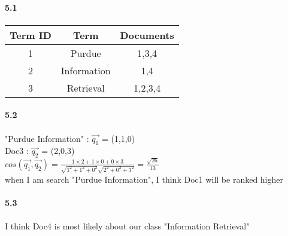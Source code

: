 \documentclass{article}
\begin{document}
	\paragraph{5.1}
	\paragraph{}
	\begin{tabular}{|c|c|c|}
		\hline
		Term ID & Term & Documents\\
		\hline
		1 & Purdue & 1,3,4 \\
		\hline
		2 & Information & 1,4 \\
		\hline
		3 & Retrieval & 1,2,3,4 \\
		\hline
	\end{tabular}
	\paragraph{5.2}
	\paragraph{}
	\begin{flushleft}
	"Purdue Information" : $\vec{q_1}$ = (1,1,0) \\
	 Doc3 : $\vec{q_2}$ = (2,0,3) \\
	$cos(\vec{q_1},\vec{q_2}) = \frac{1 \times 2 + 1 \times 0 + 0 \times 3}{\sqrt{1^2 + 1^2 + 0^2}  \sqrt{2^2 + 0^2 + 3^2}} = \frac{\sqrt{26}}{13} $  \\ 
	when I am search "Purdue Information", I think Doc1 will be ranked higher
	\paragraph{5.3}
	\paragraph{} I think Doc4 is most likely about our class "Information Retrieval"
	\end{flushleft} 
	
\end{document}
